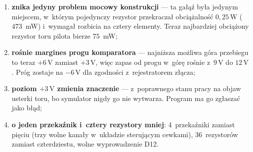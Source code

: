 \documentclass[a4paper,11pt]{article}
\newcommand{\volt}{\,\mathrm{V}}
\newcommand{\watt}{\,\mathrm{W}}
\begin{document}
\begin{enumerate}
\item \textbf{znika jedyny problem mocowy konstrukcji} --- ta gałąź była jedynym
      miejscem, w~którym pojedynczy rezystor przekraczał obciążalność
      $0{,}25\watt$ ($473$~mW) i~wymagał rozbicia na cztery elementy. Teraz
      najbardziej obciążony rezystor toru pilota bierze $75$~mW;
\item \textbf{rośnie margines progu komparatora} --- najniższa możliwa góra
      przebiegu to teraz $+6\volt$ zamiast $+3\volt$, więc zapas od progu w~górę
      rośnie z~$9\volt$ do $12\volt$. Próg zostaje na $-6\volt$ dla zgodności
      z~rejestratorem złącza;
\item \textbf{poziom $+3\volt$ zmienia znaczenie} --- z~poprawnego stanu pracy na
      objaw usterki toru, bo symulator nigdy go nie wytwarza. Program ma go zgłaszać
      jako błąd;
\item \textbf{o jeden przekaźnik i~cztery rezystory mniej}: 4~przekaźniki zamiast
      pięciu (trzy wolne kanały w~układzie sterującym cewkami), 36~rezystorów
      zamiast czterdziestu, wolne wyprowadzenie D12.
\end{enumerate}
\end{document}
